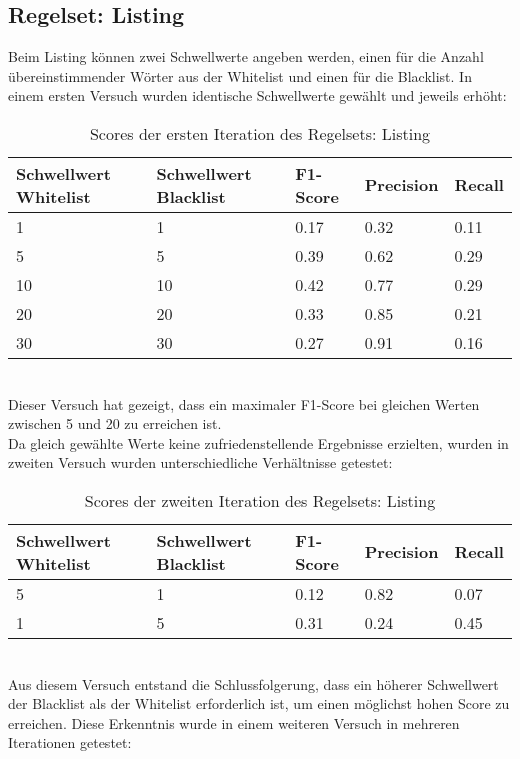 \subsection{Regelset: Listing}
Beim Listing können zwei Schwellwerte angeben werden, einen für die Anzahl übereinstimmender Wörter aus der Whitelist und einen für die Blacklist.
In einem ersten Versuch wurden identische Schwellwerte gewählt und jeweils erhöht:\\
\begin{table}
	\caption{Scores der ersten Iteration des Regelsets: Listing}
	\centering
\begin{tabular}{|l|l|l|l|l|}
	\hline
	Schwellwert Whitelist & Schwellwert Blacklist & F1-Score & Precision & Recall\\
	\hline
	1 & 1 & 0.17 & 0.32 & 0.11 \\
	5 & 5 & 0.39 & 0.62 & 0.29 \\
	10 & 10 & 0.42 & 0.77 & 0.29 \\
	20 & 20 & 0.33 & 0.85 & 0.21 \\
	30 & 30 & 0.27 & 0.91 & 0.16 \\
	\hline
\end{tabular}
\end{table}\\
Dieser Versuch hat gezeigt, dass ein maximaler F1-Score bei gleichen Werten zwischen 5 und 20 zu erreichen ist.\\
Da gleich gewählte Werte keine zufriedenstellende Ergebnisse erzielten, wurden in zweiten Versuch wurden unterschiedliche Verhältnisse getestet:\\
\begin{table}
	\caption{Scores der zweiten Iteration des Regelsets: Listing}
	\centering
\begin{tabular}{|l|l|l|l|l|}
	\hline
	Schwellwert Whitelist & Schwellwert Blacklist & F1-Score & Precision & Recall\\
	\hline
	5 & 1 & 0.12 & 0.82 & 0.07 \\
	1 & 5 & 0.31 & 0.24 & 0.45 \\
	\hline
\end{tabular}
\end{table}\\
Aus diesem Versuch entstand die Schlussfolgerung, dass ein höherer Schwellwert der Blacklist als der Whitelist erforderlich ist, um einen möglichst hohen Score zu erreichen.
Diese Erkenntnis wurde in einem weiteren Versuch in mehreren Iterationen getestet:\\
